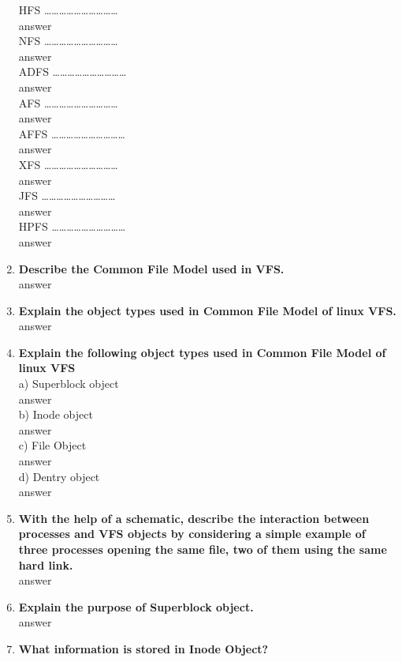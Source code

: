 \documentclass[a4paper,12pt]{article}
\begin{document}
\begin{flushleft}
\begin{enumerate}
HFS …………………………\\{\color{red}answer}\\
NFS …………………………\\{\color{red}answer}\\
ADFS …………………………\\{\color{red}answer}\\
AFS …………………………\\{\color{red}answer}\\
AFFS …………………………\\{\color{red}answer}\\
XFS …………………………\\{\color{red}answer}\\
JFS …………………………\\{\color{red}answer}\\
HPFS …………………………\\{\color{red}answer}\\
\item \textbf{  Describe the Common File Model used in VFS.}\\
{\color{red}answer}\\
\item \textbf{  Explain the object types used in Common File Model of linux VFS.}\\
{\color{red}answer}\\
\item \textbf{  Explain the following object types used in Common File Model of linux VFS}\\
a) Superblock object\\{\color{red}answer}\\
b) Inode object\\{\color{red}answer}\\
c) File Object\\{\color{red}answer}\\
d) Dentry object\\{\color{red}answer}\\
\item \textbf{  With the help of a schematic, describe the interaction between processes and VFS objects by considering a simple example of three processes opening the same file, two of them using the same hard link.}\\
{\color{red}answer}\\
\item \textbf{  Explain the purpose of Superblock object.}\\
{\color{red}answer}\\
\item \textbf{  What information is stored in Inode Object?}\\

\end{enumerate}
\end{flushleft}
\end{document}
